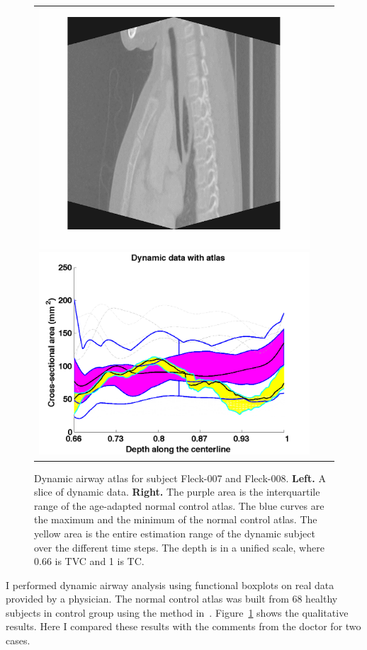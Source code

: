 \begin{figure}[tb]
\begin{center}
\begin{tabular}{ccc}
    \includegraphics[height=\figheight] {fig/Fleck_008.png}
    \includegraphics[width=\figwidth] {fig/Fleck_008_wfbplot.png} \\
    \end{tabular}
    \caption{ \label{fig:Fleck} Dynamic airway atlas for subject Fleck-007 and Fleck-008. {\bf Left.} A slice of dynamic data. {\bf Right.} The purple area is the interquartile range of the age-adapted normal control atlas. The blue curves are the maximum and the minimum of the normal control atlas. The yellow area is the entire estimation range of the dynamic subject over the different time steps. The depth is in a unified scale, where 0.66 is TVC and 1 is TC.
    }
  \end{center}
\end{figure}
I performed dynamic airway analysis using functional boxplots on real data provided by a physician.
The normal control atlas was built from 68 healthy subjects in control group using the method in~\cite{hong2014statistical}.
Figure~\ref{fig:Fleck} shows the qualitative results.
Here I compared these results with the comments from the doctor for two cases.

